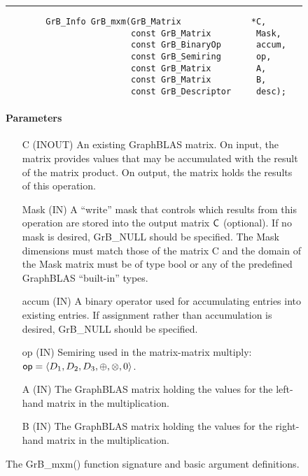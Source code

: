 \begin{figure*}[h]
\hrule
	\caption{The {\sf GrB\_mxm()} function signature and basic argument definitions.}
\label{Fig:mxm}

\begin{verbatim}
        GrB_Info GrB_mxm(GrB_Matrix              *C,
                         const GrB_Matrix         Mask,
                         const GrB_BinaryOp       accum,
                         const GrB_Semiring       op,
                         const GrB_Matrix         A, 
                         const GrB_Matrix         B,
                         const GrB_Descriptor     desc);
\end{verbatim}

\paragraph{Parameters}

\begin{itemize}[leftmargin=1.1in]
    \item[{\sf C}]    ({\sf INOUT}) An existing GraphBLAS matrix. On
    input, the matrix provides values that may be accumulated with the
    result of the matrix product.   On output, the matrix holds the
    results of this operation.

    \item[{\sf Mask}] ({\sf IN}) A ``write'' mask that controls which
    results from this operation are stored into the output matrix
    ${\sf C}$ (optional).  If no mask is desired,  {\sf GrB\_NULL}
    should be specified. The Mask dimensions must match those of the
    matrix {\sf C} and the domain of the {\sf Mask} matrix must be
    of type {\sf bool} or any of the predefined GraphBLAS ``built-in'' types.

    \item[{\sf accum}] ({\sf IN}) A binary operator used for accumulating entries
    into existing  entries. If assignment rather than accumulation is
    desired, {\sf GrB\_NULL} should be specified.

    \item[{\sf op}] ({\sf IN}) Semiring used in the matrix-matrix
    multiply: ${\sf op}=\langle D_1,D_2,D_3,\oplus,\otimes,0 \rangle$.

    \item[{\sf A}] ({\sf IN}) The GraphBLAS matrix holding the values
    for the left-hand matrix in the multiplication.

    \item[{\sf B}] ({\sf IN}) The GraphBLAS matrix holding the values
    for the right-hand matrix in the multiplication.


\end{itemize}
\end{figure*}

